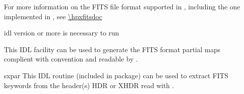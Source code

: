 \begin{codedescription}
{For more information on the FITS file format supported in \healpix, 
including the one implemented in \facname,
see \url{\hpxfitsdoc}}

\end{codedescription}



\begin{related}
  \begin{sulist}{} %
  \item[idl] version \idlversion or more is necessary to run \facname
  \item[\htmlref{write\_fits\_partial}{idl:write_fits_partial}] This \healpix IDL
facility can be used to generate the FITS format partial maps complient
with \healpix convention and readable by \facname.

    \item[sxpar] This IDL routine (included in \healpix package) can be
  used to extract FITS keywords from the header(s) HDR or XHDR read with \facname.
  \end{sulist}
\end{related}




